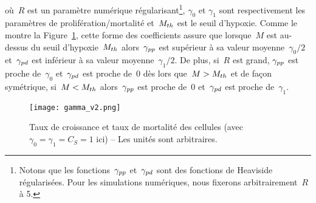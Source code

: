 \documentclass[main.tex]{subfiles}
\begin{document}
où~$R$ est un paramètre numérique régularisant\footnote{Notons que les fonctions~$\gamma_{pp}$ et~$\gamma_{pd}$ sont des fonctions de Heaviside régularisées. Pour les simulations numériques, nous fixerons arbitrairement~$R$ à 5.}, $\gamma_0$ et
$\gamma_1$ sont respectivement les paramètres de 
prolifération/mortalité et~$M_{th}$ est le seuil d'hypoxie. 
Comme le montre la Figure~\ref{fig:gamma}, cette forme des coefficients assure que lorsque~$M$ est au-dessus du seuil d'hypoxie~$M_{th}$ alors~$\gamma_{pp}$ est supérieur à sa valeur moyenne~$\gamma_0/2$ et~$\gamma_{pd}$ est inférieur à sa valeur moyenne~$\gamma_1/2$. De plus, si~$R$ est grand, $\gamma_{pp}$ est proche de~$\gamma_0$ et~$\gamma_{pd}$ est proche de~0 dès lors que~$M>M_{th}$ et de façon symétrique, si~$M<M_{th}$ alors~$\gamma_{pp}$ est proche de~0  et~$\gamma_{pd}$ est proche de~$\gamma_1$.

\begin{figure}
\centering
\texttt{[image: gamma\_v2.png]}
\caption{\label{fig:gamma}Taux de croissance et taux de mortalité des cellules (avec $\gamma_0=\gamma_1=C_S=1$ ici) -- Les unités sont arbitraires.}
\end{figure}
\end{document}
